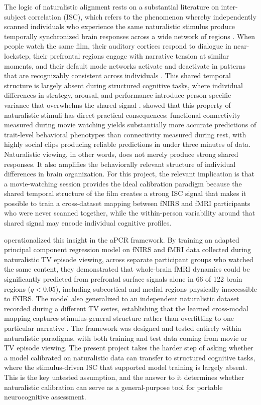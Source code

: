 The logic of naturalistic alignment rests on a substantial literature on inter-subject
correlation (ISC), which refers to the phenomenon whereby independently scanned
individuals who experience the same naturalistic stimulus produce temporally synchronized
brain responses across a wide network of regions \parencite{hasson2004, hasson2010,
nastase2019}. When people watch the same film, their auditory cortices respond to
dialogue in near-lockstep, their prefrontal regions engage with narrative tension at
similar moments, and their default mode networks activate and deactivate in patterns that
are recognizably consistent across individuals \parencite{hasson2010}. This shared
temporal structure is largely absent during structured cognitive tasks, where individual
differences in strategy, arousal, and performance introduce person-specific variance that
overwhelms the shared signal \parencite{nastase2019}. \textcite{finn2021} showed that
this property of naturalistic stimuli has direct practical consequences: functional
connectivity measured during movie watching yields substantially more accurate predictions
of trait-level behavioral phenotypes than connectivity measured during rest, with highly
social clips producing reliable predictions in under three minutes of data. Naturalistic
viewing, in other words, does not merely produce strong shared responses. It also
amplifies the behaviorally relevant structure of individual differences in brain
organization. For this project, the relevant implication is that a movie-watching session
provides the ideal calibration paradigm because the shared temporal structure of the film
creates a strong ISC signal that makes it possible to train a cross-dataset mapping
between fNIRS and fMRI participants who were never scanned together, while the
within-person variability around that shared signal may encode individual cognitive
profiles.

\textcite{gao2025} operationalized this insight in the aPCR framework. By training an
adapted principal component regression model on fNIRS and fMRI data collected during
naturalistic TV episode viewing, across separate participant groups who watched the same
content, they demonstrated that whole-brain fMRI dynamics could be significantly
predicted from prefrontal surface signals alone in 66 of 122 brain regions ($q < 0.05$),
including subcortical and medial regions physically inaccessible to fNIRS. The model
also generalized to an independent naturalistic dataset recorded during a different TV
series, establishing that the learned cross-modal mapping captures stimulus-general
structure rather than overfitting to one particular narrative \parencite{gao2025}. The
\citeauthor{gao2025} framework was designed and tested entirely within naturalistic
paradigms, with both training and test data coming from movie or TV episode viewing.
The present project takes the harder step of asking whether a model calibrated on
naturalistic data can transfer to structured cognitive tasks, where the stimulus-driven
ISC that supported model training is largely absent. This is the key untested assumption,
and the answer to it determines whether naturalistic calibration can serve as a
general-purpose tool for portable neurocognitive assessment.


